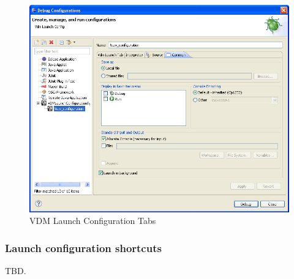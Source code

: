 \begin{figure}[htb]
\centering
\includegraphics[width=\textwidth]{figures/launchConfigurationTabs}
\caption{VDM Launch Configuration Tabs}
\label{fig:launchConfigurationTabs}
\end{figure}

\subsubsection{Launch configuration shortcuts}
TBD.
